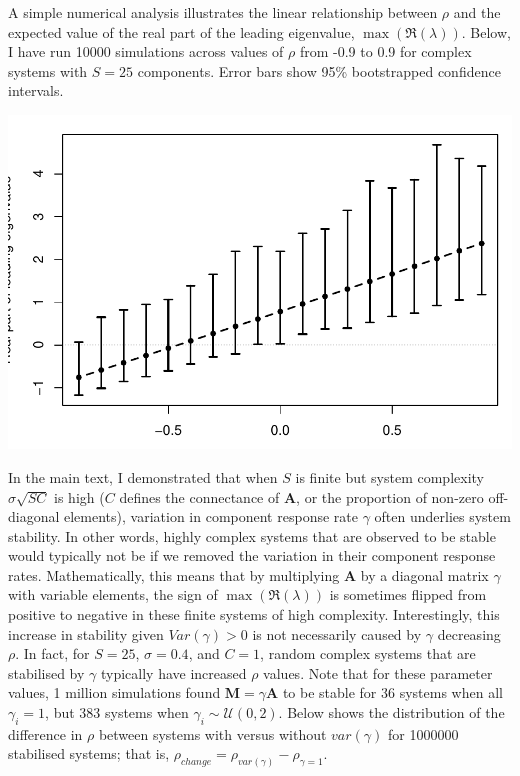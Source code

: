 \documentclass[]{article}
\begin{document}
A simple numerical analysis illustrates the linear relationship between
\(\rho\) and the expected value of the real part of the leading
eigenvalue, \(\max(\Re(\lambda))\). Below, I have run 10000 simulations
across values of \(\rho\) from -0.9 to 0.9 for complex systems with
\(S = 25\) components. Error bars show 95\% bootstrapped confidence
intervals.

\includegraphics{revision_notes_files/figure-latex/unnamed-chunk-4-1.pdf}

In the main text, I demonstrated that when \(S\) is finite but system
complexity \(\sigma\sqrt{SC}\) is high (\(C\) defines the connectance of
\(\textbf{A}\), or the proportion of non-zero off-diagonal elements),
variation in component response rate \(\gamma\) often underlies system
stability. In other words, highly complex systems that are observed to
be stable would typically not be if we removed the variation in their
component response rates. Mathematically, this means that by multiplying
\(\textbf{A}\) by a diagonal matrix \(\gamma\) with variable elements,
the sign of \(\max(\Re(\lambda))\) is sometimes flipped from positive to
negative in these finite systems of high complexity. Interestingly, this
increase in stability given \(Var(\gamma) > 0\) is not necessarily
caused by \(\gamma\) decreasing \(\rho\). In fact, for \(S = 25\),
\(\sigma = 0.4\), and \(C = 1\), random complex systems that are
stabilised by \(\gamma\) typically have increased \(\rho\) values. Note
that for these parameter values, 1 million simulations found
\(\textbf{M} = \gamma \textbf{A}\) to be stable for 36 systems when all
\(\gamma_{i} = 1\), but 383 systems when
\(\gamma_{i} \sim \mathcal{U}(0, 2)\). Below shows the distribution of
the difference in \(\rho\) between systems with versus without
\(var(\gamma)\) for 1000000 stabilised systems; that is,
\(\rho_{change} = \rho_{var(\gamma)} - \rho_{\gamma = 1}\).
\end{document}
